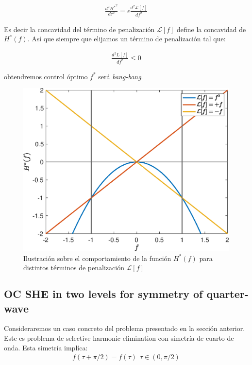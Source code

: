\begin{gather}
    \frac{d^2{H^*}^2}{d\tau^2} = \epsilon \frac{d^2\mathcal{L}[f]}{df^2} 
\end{gather}

Es decir la concavidad del término de penalización $\mathcal{L}[f]$ define la concavidad de $H^*(f)$. Así que siempre que elijamos un término de penalización tal que:

\begin{gather}
    \frac{d^2L[f]}{df^2} \leq 0 
\end{gather}

obtendremos control óptimo $f^*$ será \emph{bang-bang}.
\newline

\begin{figure}[!ht]
    \centering
    \includegraphics[scale=0.5]{img/bang-bang.eps}
    \caption{Ilustración sobre el comportamiento de la función $H^*(f)$ para distintos términos de penalización $\mathcal{L}[f]$}
\end{figure}


\subsection{OC SHE in two levels for symmetry of quarter-wave} 

Consideraremos un caso concreto del problema presentado en la sección anterior. Este es problema de selective harmonic elimination con simetría de cuarto de onda. Esta simetría implíca:
\begin{gather}
    f(\tau + \pi/2)   = f(\tau)    \ \ \tau \in (0,\pi/2)
\end{gather}

